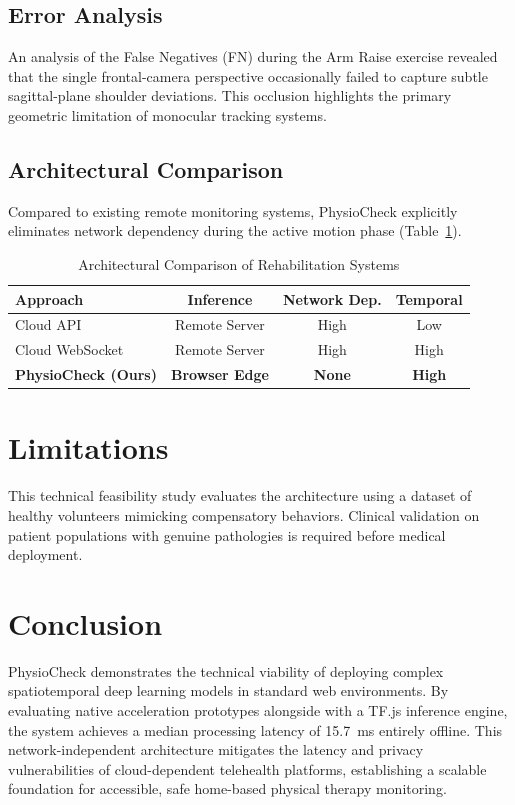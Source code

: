 \documentclass[conference]{IEEEtran}
\begin{document}
\subsection{Error Analysis}
An analysis of the False Negatives (FN) during the Arm Raise exercise revealed that the single frontal-camera perspective occasionally failed to capture subtle sagittal-plane shoulder deviations. This occlusion highlights the primary geometric limitation of monocular tracking systems.

\subsection{Architectural Comparison}
Compared to existing remote monitoring systems, PhysioCheck explicitly eliminates network dependency during the active motion phase (Table~\ref{tab:sota}).

\begin{table}[htbp]
\caption{Architectural Comparison of Rehabilitation Systems}
\begin{center}
\begin{tabular}{@{}lccc@{}}
\toprule
\textbf{Approach} & \textbf{Inference} & \textbf{Network Dep.} & \textbf{Temporal} \\ \midrule
Cloud API \cite{kandala_2024} & Remote Server & High & Low \\
Cloud WebSocket & Remote Server & High & High \\
\textbf{PhysioCheck (Ours)} & \textbf{Browser Edge} & \textbf{None} & \textbf{High} \\ \bottomrule
\end{tabular}
\label{tab:sota}
\end{center}
\end{table}

\section{Limitations}
This technical feasibility study evaluates the architecture using a dataset of healthy volunteers mimicking compensatory behaviors. Clinical validation on patient populations with genuine pathologies is required before medical deployment.

\section{Conclusion}
PhysioCheck demonstrates the technical viability of deploying complex spatiotemporal deep learning models in standard web environments. By evaluating native acceleration prototypes alongside with a TF.js inference engine, the system achieves a median processing latency of 15.7~ms entirely offline. This network-independent architecture mitigates the latency and privacy vulnerabilities of cloud-dependent telehealth platforms, establishing a scalable foundation for accessible, safe home-based physical therapy monitoring.
\end{document}
